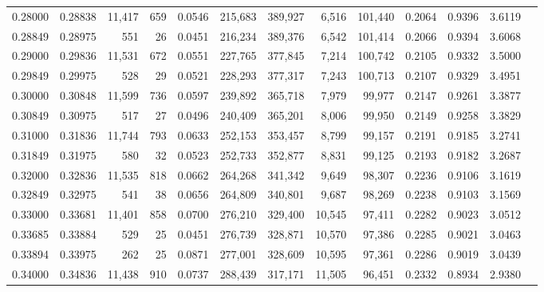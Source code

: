 \begin{tabular}{rrrrrrrrrrrrr}
0.28000 & 0.28838 & 11,417 &   659 &                                     0.0546 & 215,683 & 389,927 &   6,516 & 101,440 & 0.2064 & 0.9396 & 3.6119 \\
0.28849 & 0.28975 &    551 &    26 &                                     0.0451 & 216,234 & 389,376 &   6,542 & 101,414 & 0.2066 & 0.9394 & 3.6068 \\
0.29000 & 0.29836 & 11,531 &   672 &                                     0.0551 & 227,765 & 377,845 &   7,214 & 100,742 & 0.2105 & 0.9332 & 3.5000 \\
0.29849 & 0.29975 &    528 &    29 &                                     0.0521 & 228,293 & 377,317 &   7,243 & 100,713 & 0.2107 & 0.9329 & 3.4951 \\
0.30000 & 0.30848 & 11,599 &   736 &                                     0.0597 & 239,892 & 365,718 &   7,979 &  99,977 & 0.2147 & 0.9261 & 3.3877 \\
0.30849 & 0.30975 &    517 &    27 &                                     0.0496 & 240,409 & 365,201 &   8,006 &  99,950 & 0.2149 & 0.9258 & 3.3829 \\
0.31000 & 0.31836 & 11,744 &   793 &                                     0.0633 & 252,153 & 353,457 &   8,799 &  99,157 & 0.2191 & 0.9185 & 3.2741 \\
0.31849 & 0.31975 &    580 &    32 &                                     0.0523 & 252,733 & 352,877 &   8,831 &  99,125 & 0.2193 & 0.9182 & 3.2687 \\
0.32000 & 0.32836 & 11,535 &   818 &                                     0.0662 & 264,268 & 341,342 &   9,649 &  98,307 & 0.2236 & 0.9106 & 3.1619 \\
0.32849 & 0.32975 &    541 &    38 &                                     0.0656 & 264,809 & 340,801 &   9,687 &  98,269 & 0.2238 & 0.9103 & 3.1569 \\
0.33000 & 0.33681 & 11,401 &   858 &                                     0.0700 & 276,210 & 329,400 &  10,545 &  97,411 & 0.2282 & 0.9023 & 3.0512 \\
0.33685 & 0.33884 &    529 &    25 &                                     0.0451 & 276,739 & 328,871 &  10,570 &  97,386 & 0.2285 & 0.9021 & 3.0463 \\
0.33894 & 0.33975 &    262 &    25 &                                     0.0871 & 277,001 & 328,609 &  10,595 &  97,361 & 0.2286 & 0.9019 & 3.0439 \\
0.34000 & 0.34836 & 11,438 &   910 &                                     0.0737 & 288,439 & 317,171 &  11,505 &  96,451 & 0.2332 & 0.8934 & 2.9380 \\

\end{tabular}
